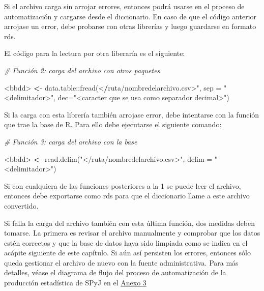 \documentclass[
  spanish,
]{book}
\newenvironment{Shaded}{\begin{snugshade}}{\end{snugshade}}
\newcommand{\AttributeTok}[1]{\textcolor[rgb]{0.77,0.63,0.00}{#1}}
\newcommand{\CommentTok}[1]{\textcolor[rgb]{0.56,0.35,0.01}{\textit{#1}}}
\newcommand{\ErrorTok}[1]{\textcolor[rgb]{0.64,0.00,0.00}{\textbf{#1}}}
\newcommand{\FunctionTok}[1]{\textcolor[rgb]{0.00,0.00,0.00}{#1}}
\newcommand{\NormalTok}[1]{#1}
\newcommand{\SpecialCharTok}[1]{\textcolor[rgb]{0.00,0.00,0.00}{#1}}
\newcommand{\StringTok}[1]{\textcolor[rgb]{0.31,0.60,0.02}{#1}}
\begin{document}
Si el archivo carga sin arrojar errores, entonces podrá usarse en el proceso de automatización y cargarse desde el diccionario. En caso de que el código anterior arrojase un error, debe probarse con otras librerías y luego guardarse en formato rds.

El código para la lectura por otra liberaría es el siguiente:

\begin{Shaded}
\begin{Highlighting}[]
\CommentTok{\# Función 2: carga del archivo con otros paquetes}

\SpecialCharTok{\textless{}}\NormalTok{bbdd}\SpecialCharTok{\textgreater{}} \ErrorTok{\textless{}}\SpecialCharTok{{-}}\NormalTok{ data.table}\SpecialCharTok{::}\FunctionTok{fread}\NormalTok{(}\SpecialCharTok{\textless{}}\ErrorTok{/}\NormalTok{ruta}\SpecialCharTok{/}\NormalTok{nombredelarchivo.csv}\SpecialCharTok{\textgreater{}}\StringTok{", sep = "}\SpecialCharTok{\textless{}}\NormalTok{delimitador}\SpecialCharTok{\textgreater{}}\StringTok{", dec="}\SpecialCharTok{\textless{}}\NormalTok{caracter que se usa como separador decimal}\SpecialCharTok{\textgreater{}}\StringTok{")}
\end{Highlighting}
\end{Shaded}

Si la carga con esta librería también arrojase error, debe intentarse con la función que trae la base de R. Para ello debe ejecutarse el siguiente comando:

\begin{Shaded}
\begin{Highlighting}[]
\CommentTok{\# Función 3: carga del archivo con la base}

\SpecialCharTok{\textless{}}\NormalTok{bbdd}\SpecialCharTok{\textgreater{}} \ErrorTok{\textless{}}\SpecialCharTok{{-}} \FunctionTok{read.delim}\NormalTok{(}\StringTok{"\textless{}/ruta/nombredelarchivo.csv\textgreater{}"}\NormalTok{, }\AttributeTok{delim =} \StringTok{"\textless{}delimitador\textgreater{}"}\NormalTok{)}
\end{Highlighting}
\end{Shaded}

Si con cualquiera de las funciones posteriores a la 1 se puede leer el archivo, entonces debe exportarse como rds para que el diccionario llame a este archivo convertido.

Si falla la carga del archivo también con esta última función, dos medidas deben tomarse. La primera es revisar el archivo manualmente y comprobar que los datos estén correctos y que la base de datos haya sido limpiada como se indica en el acápite siguiente de este capítulo. Si aún así persisten los errores, entonces sólo queda gestionar el archivo de nuevo con la fuente administrativa. Para más detalles, véase el diagrama de flujo del proceso de automatización de la producción estadística de SPyJ en el \protect\hyperlink{anexo3}{Anexo 3}
\end{document}
